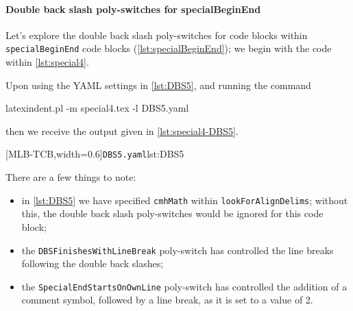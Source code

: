  \paragraph{Double back slash poly-switches for specialBeginEnd}
  \begin{example}
  Let's explore the double back slash poly-switches for code blocks within
  \texttt{specialBeginEnd} code blocks (\vref{lst:specialBeginEnd}); we begin with the code
  within \cref{lst:special4}.     


  Upon using the YAML settings in \cref{lst:DBS5}, and running the command
   

  \begin{commandshell}
latexindent.pl -m special4.tex -l DBS5.yaml
\end{commandshell}

  then we receive the output given in \cref{lst:special4-DBS5}. 

  \begin{cmhtcbraster}[
    raster force size=false,
    raster column 1/.style={add to width=-.1\textwidth},
    raster column skip=.06\linewidth]
   [MLB-TCB,width=0.6\textwidth]{\texttt{DBS5.yaml}}{lst:DBS5}
  \end{cmhtcbraster}

  There are a few things to note:
  \begin{itemize}
   \item in \cref{lst:DBS5} we have specified \texttt{cmhMath} within \texttt{lookForAlignDelims};
         without this, the double back slash poly-switches would be ignored for this code block;
   \item the \texttt{DBSFinishesWithLineBreak} poly-switch has controlled the line breaks
         following the double back slashes;
   \item the \texttt{SpecialEndStartsOnOwnLine} poly-switch has controlled the addition of a
         comment symbol, followed by a line break, as it is set to a value of 2.
  \end{itemize}
  \end{example}

